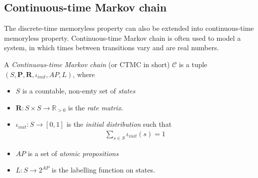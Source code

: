 \subsection{Continuous-time Markov chain}
The discrete-time memoryless property can also be extended into continuous-time memoryless property.
Continuous-time Markov chain is often used to model a system, in which times between transitions
vary and are real numbers.
\begin{definition}
      A \textit{Continuous-time Markov chain} (or CTMC in short) $\mathcal{C}$ is a tuple
      $(S,\mathbf{P}, \mathbf{R}, \iota_{init}, AP, L)$, where
      \begin{itemize}
            \item $S$ is a countable, non-emty set of \textit{states}
            \item $\mathbf{R}:S\times S \rightarrow \mathbb{R}_{>0}$ is the \textit{rate matrix}.
            \item $\iota_{init}: S \rightarrow [0,1]$ is the \textit{initial distribution} such that
                  \begin{align*}
                        \sum_{s\in S}\iota_{init}(s) = 1
                  \end{align*}
            \item $AP$ is a set of \textit{atomic propositions}
            \item $L: S \rightarrow 2^{AP}$ is the labelling function on states.
      \end{itemize}
\end{definition}

